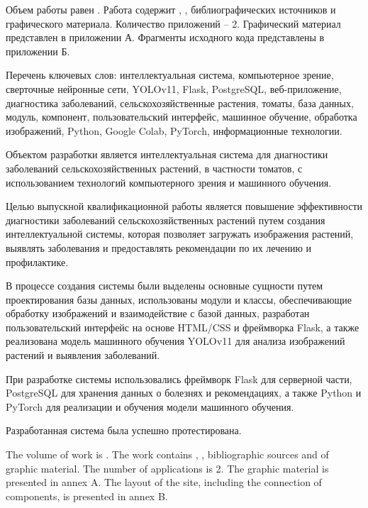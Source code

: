 
Объем работы равен . Работа содержит , ,  библиографических источников и  графического материала. Количество приложений – 2. Графический материал представлен в приложении А. Фрагменты исходного кода представлены в приложении Б.

Перечень ключевых слов: интеллектуальная система, компьютерное зрение, сверточные нейронные сети, YOLOv11, Flask, PostgreSQL, веб-приложение, диагностика заболеваний, сельскохозяйственные растения, томаты, база данных, модуль, компонент, пользовательский интерфейс, машинное обучение, обработка изображений, Python, Google Colab, PyTorch, информационные технологии.

Объектом разработки является интеллектуальная система для диагностики заболеваний сельскохозяйственных растений, в частности томатов, с использованием технологий компьютерного зрения и машинного обучения.

Целью выпускной квалификационной работы является повышение эффективности диагностики заболеваний сельскохозяйственных растений путем создания интеллектуальной системы, которая позволяет загружать изображения растений, выявлять заболевания и предоставлять рекомендации по их лечению и профилактике.

В процессе создания системы были выделены основные сущности путем проектирования базы данных, использованы модули и классы, обеспечивающие обработку изображений и взаимодействие с базой данных, разработан пользовательский интерфейс на основе HTML/CSS и фреймворка Flask, а также реализована модель машинного обучения YOLOv11 для анализа изображений растений и выявления заболеваний.

При разработке системы использовались фреймворк Flask для серверной части, PostgreSQL для хранения данных о болезнях и рекомендациях, а также Python и PyTorch для реализации и обучения модели машинного обучения. 

Разработанная система была успешно протестирована.

  
The volume of work is . The work contains , ,  bibliographic sources and  of graphic material. The number of applications is 2. The graphic material is presented in annex A. The layout of the site, including the connection of components, is presented in annex B.

